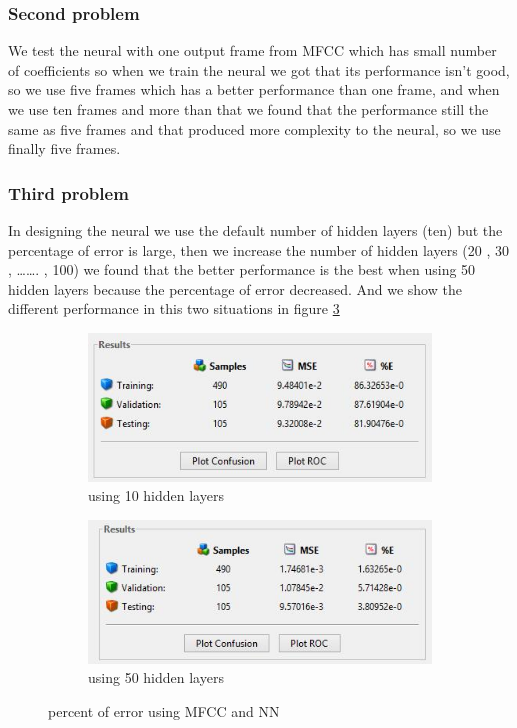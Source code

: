 \documentclass[12pt, a4paper, twoside]{report}
\begin{document}
\subsubsection{Second problem}
We test the neural with one output frame from MFCC which has small number of coefficients so when we train the neural we got that its performance isn't good, so we use five frames which has a better performance than one frame, and when we use ten frames and more than that we found that the performance still the same as five frames and that produced more complexity to the neural, so we use finally five frames.
\subsubsection{Third problem}
In designing the neural we use the default number of hidden layers (ten) but the percentage of error is large, then we increase the number of hidden layers (20 , 30 , ……. , 100) we found that the better performance is the best when using  50 hidden layers because the percentage of error decreased. And we show the different performance in this two situations in figure \ref{fig:nn-hidden-layers}
\begin{figure}[!h]
    \centering
    \begin{subfigure}[b]{0.48\textwidth}
        \includegraphics[width=\textwidth]
        {images/chapter5/nn-10-layers}
        \caption{using 10 hidden layers}
        \label{fig:nn-10-layers}
    \end{subfigure}
    \hfill
    \begin{subfigure}[b]{0.48\textwidth}
        \includegraphics[width=\textwidth]
        {images/chapter5/nn-50-layers}
        \caption{using 50 hidden layers}
        \label{fig:nn-50-layers}
    \end{subfigure}
    \caption{percent of error using MFCC and NN}
    \label{fig:nn-hidden-layers}
\end{figure}
\end{document}
